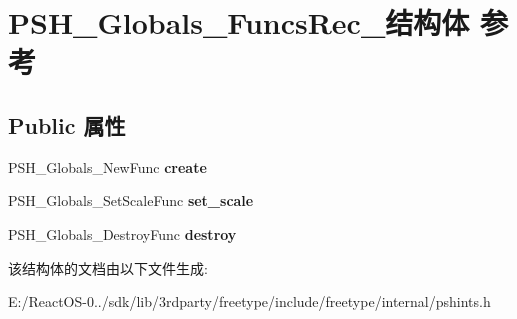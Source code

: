 \hypertarget{struct_p_s_h___globals___funcs_rec__}{}\section{P\+S\+H\+\_\+\+Globals\+\_\+\+Funcs\+Rec\+\_\+结构体 参考}
\label{struct_p_s_h___globals___funcs_rec__}
\subsection*{Public 属性}
\begin{DoxyCompactItemize}
\item 
\mbox{\label{struct_p_s_h___globals___funcs_rec___ac136cec55ea33a2e3b60ffdad20f5420}} 
P\+S\+H\+\_\+\+Globals\+\_\+\+New\+Func {\bfseries create}
\item 
\mbox{\label{struct_p_s_h___globals___funcs_rec___a9c97456d3f521cb1091f08c2bda27332}} 
P\+S\+H\+\_\+\+Globals\+\_\+\+Set\+Scale\+Func {\bfseries set\+\_\+scale}
\item 
\mbox{\label{struct_p_s_h___globals___funcs_rec___aebb5534f8305a189b09adfebff4f57ba}} 
P\+S\+H\+\_\+\+Globals\+\_\+\+Destroy\+Func {\bfseries destroy}
\end{DoxyCompactItemize}


该结构体的文档由以下文件生成\+:\begin{DoxyCompactItemize}
\item 
E\+:/\+React\+O\+S-\/0../sdk/lib/3rdparty/freetype/include/freetype/internal/pshints.\+h\end{DoxyCompactItemize}
